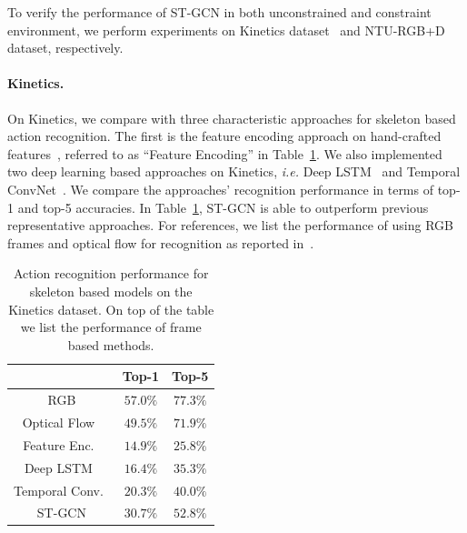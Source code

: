 \documentclass[letterpaper]{article} %
\begin{document}
To verify the performance of ST-GCN in both unconstrained and constraint environment, we perform experiments on Kinetics dataset~\cite{Kay2017Kinetics} and NTU-RGB+D dataset\cite{Shahroudy2016CVPR}, respectively.

\paragraph{Kinetics.}
On Kinetics, we compare with three characteristic approaches for skeleton based action recognition. The first is the feature encoding approach on hand-crafted features~\cite{Fernando2015VideoDarwin}, referred to as ``Feature Encoding'' in Table~\ref{tab:kinetics}.
We also implemented two deep learning based approaches on Kinetics, \emph{i.e.} Deep LSTM~\cite{Shahroudy2016CVPR} and Temporal ConvNet~\cite{Kim2017CVPRW}.
We compare the approaches' recognition performance in terms of top-1 and top-5 accuracies.
In Table~\ref{tab:kinetics}, ST-GCN is able to outperform previous representative approaches.
For references, we list the performance of using RGB frames and optical flow for recognition as reported in~\cite{Kay2017Kinetics}.

\begin{table}
	\centering
	\begin{tabular}{c|c|c}
		\hline
		& Top-1 & Top-5 \\ \hline
		RGB\cite{Kay2017Kinetics}				& 	$57.0\%$ &$77.3\%$\\
		Optical Flow~\cite{Kay2017Kinetics}	& 	$49.5\%$ &$71.9\%$ \\\hline
		Feature Enc.~\cite{Fernando2015VideoDarwin}	& $14.9\%$	& $25.8\%$\\
		Deep LSTM~\cite{Shahroudy2016CVPR}		& $16.4\%$	&$35.3\%$  \\
		Temporal Conv.~\cite{Kim2017CVPRW}	& $20.3\%$& $40.0\%$ \\\hline
		ST-GCN 					&  $\mathbf{30.7\%}$& $\mathbf{52.8\%}$ \\\hline
	\end{tabular}
	\caption{Action recognition performance for skeleton based models on the Kinetics dataset.  On top of the table we list the performance of frame based methods. }\label{tab:kinetics}
\end{table}
\end{document}
